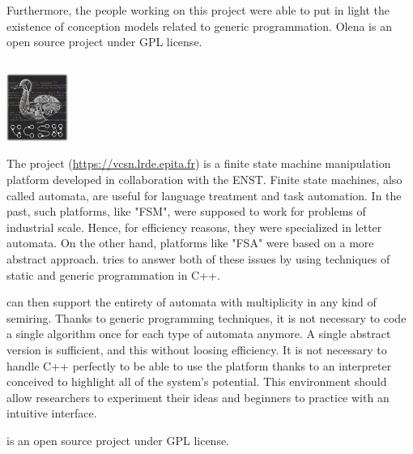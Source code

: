 Furthermore, the people working on this project were able to put in light the existence of conception
models related to generic programmation. Olena is an open source project under GPL license.


\subsection{\VCSN}
\begin{center}
 \includegraphics[width=2cm]{img/vcsn.png}
\end{center}
The \VCSN project (\url{https://vcsn.lrde.epita.fr}) is a finite state machine manipulation
platform developed in collaboration with the ENST. Finite state machines, also called automata,
are useful for language treatment and task automation. In the past, such platforms, like "FSM",
were supposed to work for problems of industrial scale. Hence, for efficiency reasons, they were
specialized in letter automata. On the other hand, platforms like "FSA" were based on a more abstract
approach. \VCSN tries to answer both of these issues by using techniques of static and generic
programmation in C++.

\VCSN can then support the entirety of automata with multiplicity in any kind of
semiring. Thanks to generic programming techniques, it is not necessary to code a single algorithm once
for each type of automata anymore. A single abstract version is sufficient, and this without loosing
efficiency. It is not necessary to handle C++ perfectly to be able to use the platform thanks to an
interpreter conceived to highlight all of the system's potential. This environment should allow
researchers to experiment their ideas and beginners to practice with an intuitive interface.

\VCSN is an open source project under GPL license.


